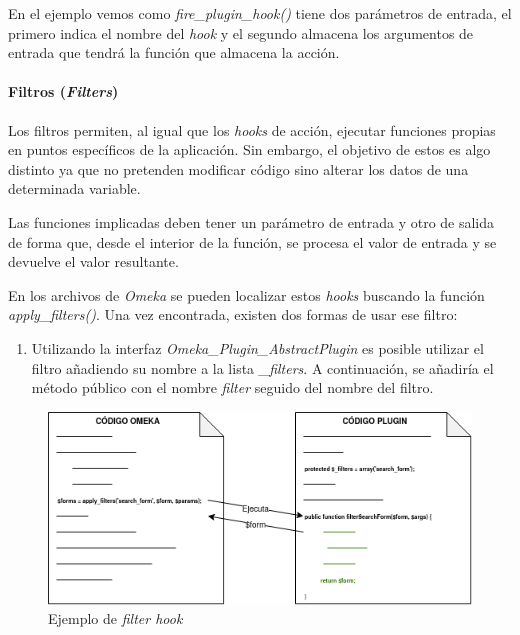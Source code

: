 \documentclass[
]{article}
\providecommand{\tightlist}{%
  \setlength{\itemsep}{0pt}\setlength{\parskip}{0pt}}
\begin{document}
En el ejemplo vemos como \emph{fire\_plugin\_hook()} tiene dos
parámetros de entrada, el primero indica el nombre del \emph{hook} y el
segundo almacena los argumentos de entrada que tendrá la función que
almacena la acción.

\hypertarget{filtros-filters}{%
\paragraph{\texorpdfstring{Filtros
(\emph{Filters})}{Filtros (Filters)}}\label{filtros-filters}}

Los filtros permiten, al igual que los \emph{hooks} de acción, ejecutar
funciones propias en puntos específicos de la aplicación. Sin embargo,
el objetivo de estos es algo distinto ya que no pretenden modificar
código sino alterar los datos de una determinada variable.

Las funciones implicadas deben tener un parámetro de entrada y otro de
salida de forma que, desde el interior de la función, se procesa el
valor de entrada y se devuelve el valor resultante.

En los archivos de \emph{Omeka} se pueden localizar estos \emph{hooks}
buscando la función \emph{apply\_filters()}. Una vez encontrada, existen
dos formas de usar ese filtro:

\begin{enumerate}
\def\labelenumi{\arabic{enumi}.}
\tightlist
\item
  Utilizando la interfaz \emph{Omeka\_Plugin\_AbstractPlugin} es posible
  utilizar el filtro añadiendo su nombre a la lista \emph{\_filters}. A
  continuación, se añadiría el método público con el nombre
  \emph{filter} seguido del nombre del filtro.
\end{enumerate}

\begin{figure}
\hypertarget{filterhooksA}{%
\centering
\includegraphics{../_static/images/filterhooksA.png}
\caption{Ejemplo de \emph{filter hook}}\label{filterhooksA}
}
\end{figure}
\end{document}
